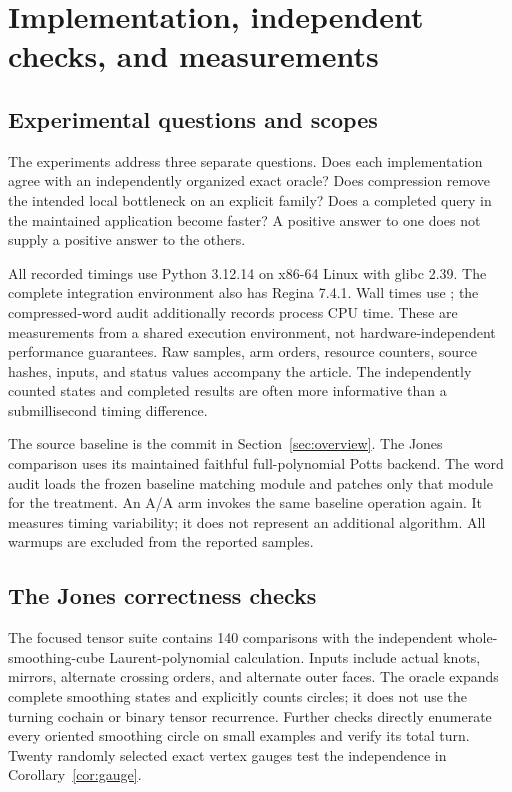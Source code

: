 \section{Implementation, independent checks, and measurements}
\label{sec:experiments}

\subsection{Experimental questions and scopes}

The experiments address three separate questions. Does each implementation
agree with an independently organized exact oracle? Does compression remove
the intended local bottleneck on an explicit family? Does a completed query
in the maintained application become faster? A positive answer to one does
not supply a positive answer to the others.

All recorded timings use Python 3.12.14 on x86-64 Linux with glibc 2.39.
The complete integration environment also has Regina 7.4.1. Wall times use
; the compressed-word audit additionally records process
CPU time. These are measurements from a shared execution environment, not
hardware-independent performance guarantees. Raw samples, arm orders,
resource counters, source hashes, inputs, and status values accompany the
article. The independently counted states and completed results are often
more informative than a submillisecond timing difference.

The source baseline is the commit in Section~\ref{sec:overview}. The Jones
comparison uses its maintained faithful full-polynomial Potts backend.
The word audit loads the frozen baseline matching module and patches only
that module for the treatment. An A/A arm invokes the same baseline
operation again. It measures timing variability; it does not represent
an additional algorithm. All warmups are excluded from the reported samples.

\subsection{The Jones correctness checks}

The focused tensor suite contains 140 comparisons with the independent
whole-smoothing-cube Laurent-polynomial calculation. Inputs include actual
knots, mirrors, alternate crossing orders, and alternate outer faces.
The oracle expands complete smoothing states and explicitly counts circles;
it does not use the turning cochain or binary tensor recurrence.
Further checks directly enumerate every oriented smoothing circle on small
examples and verify its total turn. Twenty randomly selected exact vertex
gauges test the independence in Corollary~\ref{cor:gauge}.

